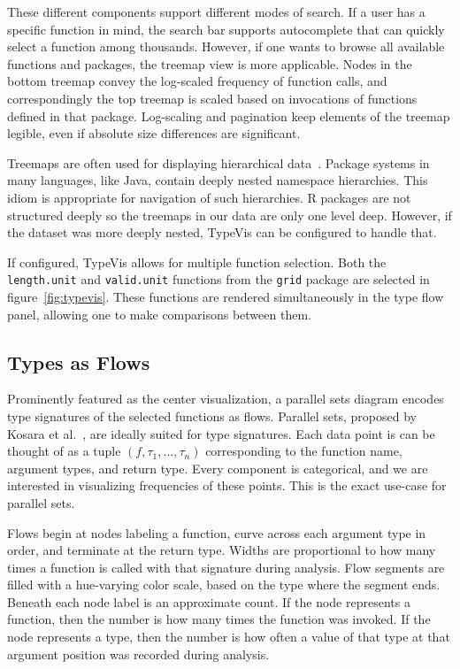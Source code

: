 \documentclass{vgtc}                          %
\newcommand{\typevis}{{\sc TypeVis}\xspace}
\begin{document}
These different components support different modes of search.
If a user has a specific function in mind,
the search bar supports autocomplete
that can quickly select a function among thousands.
However, if one wants to browse
all available functions and packages,
the treemap view is more applicable.
Nodes in the bottom treemap convey the log-scaled
frequency of function calls,
and correspondingly the top treemap
is scaled based on invocations
of functions defined in that package.
Log-scaling and pagination keep
elements of the treemap legible,
even if absolute size differences are significant.

Treemaps are often used for displaying hierarchical data~\cite{shneiderman:1992}.
Package systems in many languages,
like Java,
contain deeply nested namespace hierarchies.
This idiom is appropriate for navigation of such
hierarchies.
R packages are not structured deeply
so the treemaps in our data are only one
level deep.
However, if the dataset was more deeply nested,
\typevis can be configured to
handle that.

If configured, \typevis allows for multiple function selection.
Both the {\tt length.unit} and {\tt valid.unit} functions
from the {\tt grid} package are selected in figure~\ref{fig:typevis}.
These functions are rendered simultaneously in the type flow
panel, allowing one to make comparisons between them.

\subsection{Types as Flows}

Prominently featured as the center visualization,
a parallel sets diagram encodes type signatures of the selected
functions as flows.
Parallel sets,
proposed by Kosara et al.~\cite{kosara:2006},
are ideally suited for type signatures.
Each data point is can be thought of as
a tuple $(f, \tau_1, \ldots, \tau_n)$
corresponding to the function name,
argument types,
and return type.
Every component is categorical,
and we are interested in visualizing frequencies of these points.
This is the exact use-case for parallel sets.

Flows begin at nodes labeling a function,
curve across each argument type in order,
and terminate at the return type.
Widths are proportional to how many times a function
is called with that signature during analysis.
Flow segments are filled with a hue-varying color scale,
based on the type where the segment ends.
Beneath each node label is an approximate count.
If the node represents a function, then the
number is how many times the function was invoked.
If the node represents a type, then the
number is how often a value of that type
at that argument position was recorded during analysis.
\end{document}
